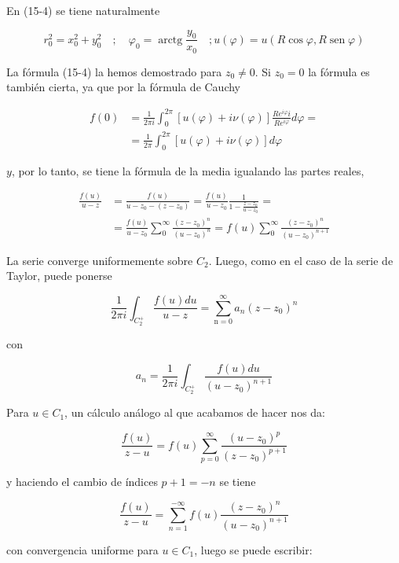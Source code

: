 \documentclass[10pt]{article}
\theoremstyle{plain}
\theoremstyle{definition}
\theoremstyle{remark}
\begin{document}
En (15-4) se tiene naturalmente

$$
r_{0}^{2}=x_{0}^{2}+y_{0}^{2} \quad ; \quad \varphi_{0}=\operatorname{arctg} \frac{y_{0}}{x_{0}} \quad ; u(\varphi)=u(R \cos \varphi, R \operatorname{sen} \varphi)
$$

La fórmula (15-4) la hemos demostrado para $z_{0} \neq 0$. Si $z_{0}=0$ la fórmula es también cierta, ya que por la fórmula de Cauchy

$$
\begin{aligned}
f(0) & =\frac{1}{2 \pi i} \int_{0}^{2 \pi}[u(\varphi)+i \nu(\varphi)] \frac{R e^{i \varphi} i}{R e^{i \varphi}} d \varphi= \\
& =\frac{1}{2 \pi} \int_{0}^{2 \pi}[u(\varphi)+i \nu(\varphi)] d \varphi
\end{aligned}
$$

$y$, por lo tanto, se tiene la fórmula de la media igualando las partes reales,


$$
\begin{aligned}
\frac{f(u)}{u-z} & =\frac{f(u)}{u-z_{0}-\left(z-z_{0}\right)}=\frac{f(u)}{u-z_{0}} \frac{1}{1-\frac{z-z_{0}}{u-z_{0}}}= \\
& =\frac{f(u)}{u-z_{0}} \sum_{0}^{\infty} \frac{\left(z-z_{0}\right)^{n}}{\left(u-z_{0}\right)^{n}}=f(u) \sum_{0}^{\infty} \frac{\left(z-z_{0}\right)^{n}}{\left(u-z_{0}\right)^{n+1}}
\end{aligned}
$$

La serie converge uniformemente sobre $C_{2}$. Luego, como en el caso de la serie de Taylor, puede ponerse

$$
\frac{1}{2 \pi i} \int_{C_{2}^{+}} \frac{f(u) d u}{u-z}=\sum_{\mathrm{n}=0}^{\infty} a_{n}\left(z-z_{0}\right)^{n}
$$

con


\begin{equation*}
a_{n}=\frac{1}{2 \pi i} \int_{C_{2}^{+}} \frac{f(u) d u}{\left(u-z_{0}\right)^{n+1}} \tag{16-2}
\end{equation*}


Para $u \in C_{1}$, un cálculo análogo al que acabamos de hacer nos da:

$$
\frac{f(u)}{z-u}=f(u) \sum_{p=0}^{\infty} \frac{\left(u-z_{0}\right)^{p}}{\left(z-z_{0}\right)^{p+1}}
$$

y haciendo el cambio de índices $p+1=-n$ se tiene

$$
\frac{f(u)}{z-u}=\sum_{n=1}^{-\infty} f(u) \frac{\left(z-z_{0}\right)^{n}}{\left(u-z_{0}\right)^{n+1}}
$$

con convergencia uniforme para $u \in C_{1}$, luego se puede escribir:
\end{document}
